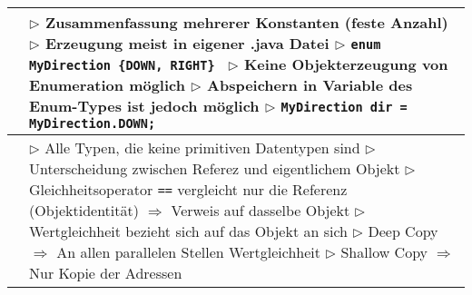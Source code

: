 \begin{tabular}{ | p{4cm} p{13.5cm} | }
	\makecell[l]{Enumeration} & \makecell[l]{$\rhd$ Zusammenfassung mehrerer Konstanten (feste Anzahl)\\
	$\rhd$ Erzeugung meist in eigener .java Datei \\
	$\rhd$ \texttt{enum MyDirection \{DOWN, RIGHT\} } \\
	$\rhd$ Keine Objekterzeugung von Enumeration möglich \\
	$\rhd$ Abspeichern in Variable des Enum-Types ist jedoch möglich \\
	$\rhd$ \texttt{MyDirection dir = MyDirection.DOWN;} } \\ \hline
	
	\makecell[l]{Referenztypen} & \makecell[l]{$\rhd$ Alle Typen, die keine primitiven Datentypen sind \\
	$\rhd$ Unterscheidung zwischen Referez und eigentlichem Objekt \\
	$\rhd$ Gleichheitsoperator \texttt{==} vergleicht nur die Referenz (Objektidentität) \\
	$\Rightarrow$ Verweis auf dasselbe Objekt \\
	$\rhd$ Wertgleichheit bezieht sich auf das Objekt an sich \\
	$\rhd$ Deep Copy $\Rightarrow$ An allen parallelen Stellen Wertgleichheit
	$\rhd$ Shallow Copy $\Rightarrow$ Nur Kopie der Adressen} \\ \hline
	\end{tabular}

